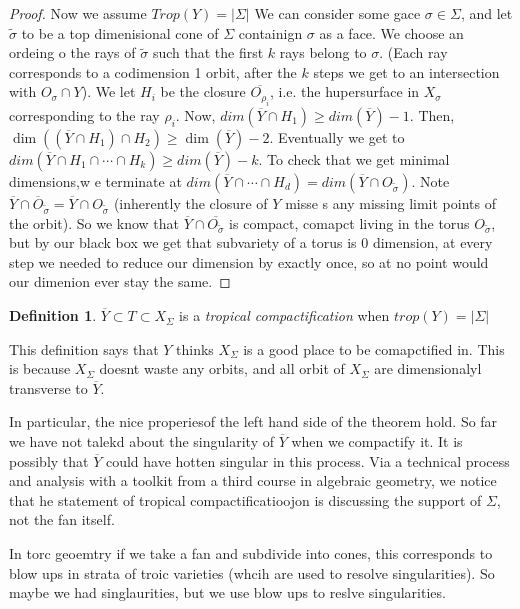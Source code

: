 \documentclass[12pt]{memoir}
\theoremstyle{definition}
\newtheorem{protodefinition}{Definition}[section]
\newenvironment{define}
   {\begin{protodefinition}}
   {\end{protodefinition}}
\begin{document}
\begin{proof}
Now we assume $Trop(Y)=|\Sigma|$   We can consider some gace $\sigma\in \Sigma$, and let $\tilde{\sigma}$ to be a top dimenisional cone of $\Sigma$ containign $\sigma$ as a face. We choose an ordeing o the rays of $\tilde{\sigma}$ such that the first $k$ rays belong to $\sigma$. (Each ray corresponds to a codimension 1 orbit, after the $k$ steps we get to an intersection with $O_\sigma \cap Y$). We let $H_i$ be the closure $\overline{O_{\rho_i}}$, i.e. the hupersurface in $X _\sigma$ corresponding to the ray $\rho_i$. Now, $dim(\overline{Y} \cap H_1) \geq dim(\overline{Y}) -1$. Then, $\dim ((\overline{Y} \cap H_1)\cap H_2) \geq \dim(\overline{Y})-2$. Eventually we get to $dim(\overline{Y} \cap H_1 \cap \cdots \cap H_k) \geq dim(\overline{Y})-k$. To check that we get minimal dimensions,w e terminate at $dim(\overline{Y} \cap \cdots \cap H_d) = dim(\overline{Y} \cap O_{\tilde{\sigma}})$. Note $\overline{Y} \cap \overline{O}_{\tilde{\sigma}} = \overline{Y} \cap O_{\tilde{\sigma}}$ (inherently the closure of $Y$ misse s any missing limit points of the orbit). So we know that $\overline{Y} \cap \overline{O_{\tilde{\sigma}}}$ is compact, comapct living in the torus $O_{\tilde{\sigma}}$, but by our black box we get that subvariety of a torus is 0 dimension, at every step we needed to reduce our dimension by exactly once, so at no point would our dimenion ever stay the same.




\end{proof}

\begin{define}
$\overline{Y} \subset T \subset X_\Sigma$ is a \emph{tropical compactification} when $trop(Y) = |\Sigma|$
\end{define}


This definition says that $Y$ thinks $X_\Sigma$ is a good place to be comapctified in. This is because $X_\Sigma$ doesnt waste any orbits, and all orbit of $X_\Sigma$ are dimensionalyl transverse to $\overline{Y}$.


In particular, the nice properiesof the left hand side of the theorem hold. So far we have not talekd about the singularity of $\overline{Y}$ when we compactify it. It is possibly that $\overline{Y}$ could have hotten singular in this process. Via a technical process and analysis with a toolkit from a third course in algebraic geometry, we notice that he statement of tropical compactificatioojon is discussing the support of $\Sigma$, not the fan itself.


In torc geoemtry if we take a fan and subdivide into cones, this corresponds to blow ups in strata of troic varieties (whcih are used to resolve singularities). So maybe we had singlaurities, but we use blow ups to reslve singularities.
\end{document}
